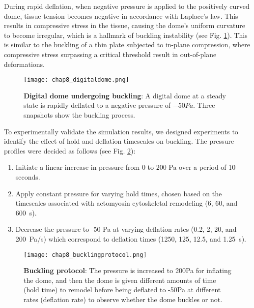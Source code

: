 During rapid deflation, when negative pressure is applied to the positively curved dome, tissue tension becomes negative in accordance with Laplace's law. This results in compressive stress in the tissue, causing the dome's uniform curvature to become irregular, which is a hallmark of buckling instability (see Fig. \ref{fig_8_1}). This is similar to the buckling of a thin plate subjected to in-plane compression, where compressive stress surpassing a critical threshold result in out-of-plane deformations. 

\begin{figure}
	\centering
	\texttt{[image: chap8\_digitaldome.png]}
	\caption{\label{fig_8_1} \textbf{Digital dome undergoing buckling}: A digital dome at a steady state is rapidly deflated to a negative pressure of $-50Pa$. Three snapshots show the buckling process.
	}
\end{figure}

To experimentally validate the simulation results, we designed experiments to identify the effect of hold and deflation timescales on buckling.  The pressure profiles were decided as follows (see Fig. \ref{fig_8_2}):

\begin{enumerate}
	\item Initiate a linear increase in pressure from 0 to 200 Pa over a period of 10 seconds.
	\item Apply constant pressure for varying hold times, chosen based on the timescales associated with actomyosin cytoskeletal remodeling (6, 60, and 600~s).
	\item Decrease the pressure to -50 Pa at varying deflation rates (0.2, 2, 20, and 200~Pa/s) which correspond to deflation times (1250, 125, 12.5, and 1.25~s).
\end{enumerate}

\begin{figure}[]
	\centering
	\texttt{[image: chap8\_bucklingprotocol.png]}
	\caption{\textbf{Buckling protocol}: The pressure is increased to 200Pa for inflating the dome, and then the dome is given different amounts of time (hold time) to remodel before being deflated to -50Pa at different rates (deflation rate) to observe whether the dome buckles or not.} \label{fig_8_2}
\end{figure}


